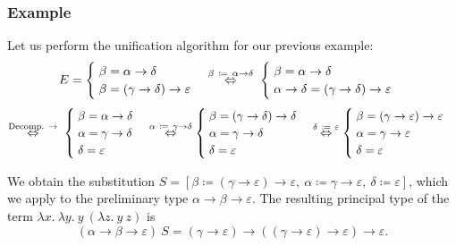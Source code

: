 \subsubsection{Example}
Let us perform the unification algorithm for our previous example:
\[
    E = \begin{cases}
        \;\beta = \alpha \to \delta \\
        \;\beta = (\gamma \to \delta) \to \varepsilon
    \end{cases}
    \overset{\beta\ \coloneqq\ \alpha \to \delta}{\Leftrightarrow}\;
    \begin{cases}
        \;\beta = \alpha \to \delta \\
        \;\alpha \to \delta = (\gamma \to \delta) \to \varepsilon
    \end{cases}
\]\vspace{1mm}
\[
    \overset{\text{Decomp.}\ \to}{\Leftrightarrow}\;
    \begin{cases}
        \;\beta = \alpha \to \delta \\
        \;\alpha = \gamma \to \delta \\
        \;\delta = \varepsilon
    \end{cases}
    \overset{\alpha\ \coloneqq\ \gamma \to \delta}{\Leftrightarrow}
    \begin{cases}
        \;\beta = (\gamma \to \delta) \to \delta \\
        \;\alpha = \gamma \to \delta \\
        \;\delta = \varepsilon
    \end{cases}
    \overset{\delta\ \coloneqq\ \varepsilon}{\Leftrightarrow}
    \begin{cases}
        \;\beta = (\gamma \to \varepsilon) \to \varepsilon \\
        \;\alpha = \gamma \to \varepsilon \\
        \;\delta = \varepsilon
    \end{cases}
\]

We obtain the substitution
$S = [\beta \coloneqq (\gamma \to \varepsilon) \to \varepsilon,\
\alpha \coloneqq \gamma \to \varepsilon,\ \delta \coloneqq \varepsilon]$,
which we apply to the preliminary type $\alpha \to \beta \to \varepsilon$.
The resulting principal type of the term
$\lambda x.\ \lambda y.\ y\ (\lambda z.\ y\ z)$ is
\[ (\alpha \to \beta \to \varepsilon)\ S =
    (\gamma \to \varepsilon) \to ((\gamma \to \varepsilon) \to \varepsilon)
    \to \varepsilon . \]


